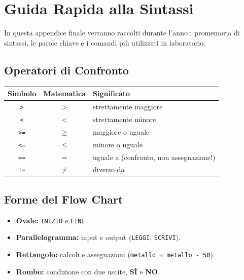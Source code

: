 \documentclass[11pt,a4paper,openany]{book}
\begin{document}
\backmatter

\chapter{Guida Rapida alla Sintassi}
\noindent In questa appendice finale verranno raccolti durante l'anno i promemoria di sintassi, le parole chiave e i comandi più utilizzati in laboratorio.

\section*{Operatori di Confronto}
\begin{center}
\renewcommand{\arraystretch}{1.3}
\begin{tabular}{|c|c|l|}
\hline
\rowcolor{PiazzaPrimary!15}
\textbf{Simbolo} & \textbf{Matematica} & \textbf{Significato} \\
\hline
\texttt{>}  & $>$    & strettamente maggiore \\
\texttt{<}  & $<$    & strettamente minore \\
\texttt{>=} & $\geq$ & maggiore o uguale \\
\texttt{<=} & $\leq$ & minore o uguale \\
\texttt{==} & $=$    & uguale a (confronto, non assegnazione!) \\
\texttt{!=} & $\neq$ & diverso da \\
\hline
\end{tabular}
\end{center}

\section*{Forme del Flow Chart}
\begin{itemize}
  \item \textbf{Ovale:} \texttt{INIZIO} e \texttt{FINE}.
  \item \textbf{Parallelogramma:} input e output (\texttt{LEGGI}, \texttt{SCRIVI}).
  \item \textbf{Rettangolo:} calcoli e assegnazioni (\texttt{metallo = metallo - 50}).
  \item \textbf{Rombo:} condizione con due uscite, \textbf{SÌ} e \textbf{NO}.
\end{itemize}
\end{document}
